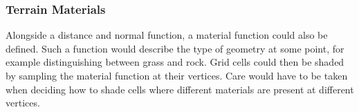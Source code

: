 \documentclass[11pt]{article}
\begin{document}
\subsubsection{Terrain Materials}
Alongside a distance and normal function, a material function could also be defined. Such a function would describe the type of geometry at some point, for example distinguishing between grass and rock. Grid cells could then be shaded by sampling the material function at their vertices. Care would have to be taken when deciding how to shade cells where different materials are present at different vertices.


\end{document}
